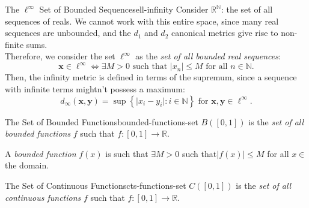 \documentclass{article}
\renewcommand*\vec{\mathbf}
\numberwithin{equation}{section}
\numberwithin{figure}{section}
\begin{document}
\begin{definition}{The \texorpdfstring{$ \ell^\infty $}{Ell-Infinity}
        Set of Bounded Sequences}{ell-infinity}
    Consider $ \mathbb{R}^\mathbb{N} $: the set of all sequences of reals. We cannot work with this entire space, since many real sequences are unbounded,
    and the $ d_1 $ and $ d_2 $ canonical metrics give rise to non-finite sums.\\
    Therefore, we consider the set $ \ell^\infty $ as the \emph{set of
    all bounded real sequences}:
    \begin{equation}
        \vec{x} \in \ell^\infty \iff \exists M > 0 \text{ such that }
            \vert x_n \vert \leq M \text { for all } n \in \mathbb{N}.
    \end{equation}
    Then, the infinity metric is defined in terms of the supremum, since a
    sequence with infinite terms mightn't possess a maximum:
    \begin{equation}
        d_\infty(\vec{x}, \vec{y}) = \sup\left\{\vert x_i - y_i \vert \colon
            i \in \mathbb{N}\right\} \text { for } \vec{x}, \vec{y} \in \ell^\infty. 
    \end{equation}
\end{definition}
\begin{definition}{The Set of Bounded Functions}{bounded-functions-set}
    $ B([0,1]) $ is the \emph{set of all bounded functions} $ f $ such that
    $ f \colon [0, 1] \to \mathbb{R} $.
    
    A \emph{bounded function} $f(x)$ is such that $\exists M >0$ such that$\vert f(x) \vert \leq M $ for all $x \in$ the domain.
\end{definition}
\begin{definition}{The Set of Continuous Functions}{cts-functions-set}
    $ C([0,1]) $ is the \emph{set of all continuous functions} $ f $ such that
    $ f \colon [0, 1] \to \mathbb{R} $.
\end{definition}
\end{document}
